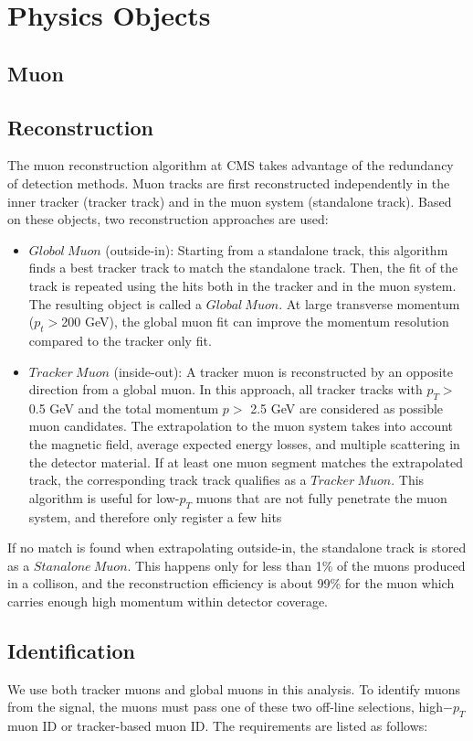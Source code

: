 \section{Physics Objects}

\subsection{Muon}
\subsection*{Reconstruction}
The muon reconstruction algorithm at CMS takes advantage of the redundancy of detection methods. Muon tracks are first reconstructed independently in the inner tracker (tracker track) and in the muon system (standalone track). Based on these objects, two reconstruction approaches are used\cite{MuonReco}:
\begin{itemize}
\item $Globol~Muon$ (outside-in): Starting from a standalone track, this algorithm finds a best tracker track to match the standalone track. Then, the fit of the track is repeated using the hits both in the tracker and in the muon system\cite{KF}. The resulting object is called a $Global~Muon$. At large transverse momentum ($p_{t} > $200 GeV), the global muon fit can improve the momentum resolution compared to the tracker only fit.
\item $Tracker~Muon$ (inside-out): A tracker muon is reconstructed by an opposite direction from a global muon. In this approach, all tracker tracks with $p_{T} >$ 0.5 GeV and the total momentum $p >$ 2.5 GeV are considered as possible muon candidates. The extrapolation to the muon system takes into account the magnetic field, average expected energy losses, and multiple scattering in the detector material. If at least one muon segment matches the extrapolated track, the corresponding track track qualifies as a $Tracker~Muon$. This algorithm is useful for low-$p_{T}$ muons that are not fully penetrate the muon system, and therefore only register a few hits
\end{itemize}

If no match is found when extrapolating outside-in, the standalone track is stored as a $Stanalone~Muon$. This happens only for less than 1\% of the muons produced in a collison, and the reconstruction efficiency is about 99\% for the muon which carries enough high momentum within detector coverage\cite{MuonReco}.

\newpage
\subsection*{Identification}
We use both tracker muons and global muons in this analysis. To identify muons from the signal, the muons must pass one of these two off-line selections, high$-p_{T}$ muon ID or tracker-based muon ID\cite{MuonID}. The requirements are listed as follows:\\


